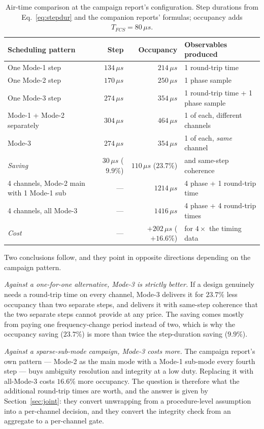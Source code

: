 \documentclass[11pt,a4paper]{article}
\newcommand{\us}{\,\ensuremath{\upmu}s}
\providecommand{\upmu}{\mu}
\begin{document}
\begin{table}[h]
\caption{Air-time comparison at the campaign report's configuration. Step durations from
Eq.~\eqref{eq:stepdur} and the companion reports' formulas; occupancy adds $T_{FCS}=80\us$.}
\label{tab:economics}
\centering\small
\begin{tabular}{@{}L{46mm}rrL{40mm}@{}}
\toprule
Scheduling pattern & Step & Occupancy & Observables produced \\
\midrule
One Mode-1 step        & $134\us$ & $214\us$ & 1 round-trip time \\
One Mode-2 step        & $170\us$ & $250\us$ & 1 phase sample \\
One Mode-3 step        & $274\us$ & $354\us$ & 1 round-trip time + 1 phase sample \\
\midrule
Mode-1 + Mode-2 separately & $304\us$ & $464\us$ & 1 of each, different channels \\
Mode-3                     & $274\us$ & $354\us$ & 1 of each, \emph{same} channel \\
\emph{Saving}              & $30\us$ ($9.9\%$) & $110\us$ ($23.7\%$) & and same-step coherence \\
 channels, Mode-2 main with 1 Mode-1 sub & --- & $1214\us$ & 4 phase + 1 round-trip time \\
4 channels, all Mode-3                    & --- & $1416\us$ & 4 phase + 4 round-trip times \\
\emph{Cost}                               & --- & $+202\us$ ($+16.6\%$) & for $4\times$ the timing data \\
\bottomrule
\end{tabular}
\end{table}

Two conclusions follow, and they point in opposite directions depending on the campaign pattern.

\emph{Against a one-for-one alternative, Mode-3 is strictly better.} If a design genuinely needs a
round-trip time on every channel, Mode-3 delivers it for $23.7\%$ less occupancy than two separate
steps, and delivers it with same-step coherence that the two separate steps cannot provide at any
price. The saving comes mostly from paying one frequency-change period instead of two, which is why
the occupancy saving ($23.7\%$) is more than twice the step-duration saving ($9.9\%$).

\emph{Against a sparse-sub-mode campaign, Mode-3 costs more.} The campaign report's own pattern ---
Mode-2 as the main mode with a Mode-1 sub-mode every fourth step --- buys ambiguity resolution and
integrity at a low duty. Replacing it with all-Mode-3 costs $16.6\%$ more occupancy. The question is
therefore what the additional round-trip times are worth, and the answer is given by
Section~\ref{sec:joint}: they convert unwrapping from a procedure-level assumption into a
per-channel decision, and they convert the integrity check from an aggregate to a per-channel gate.
\end{document}
